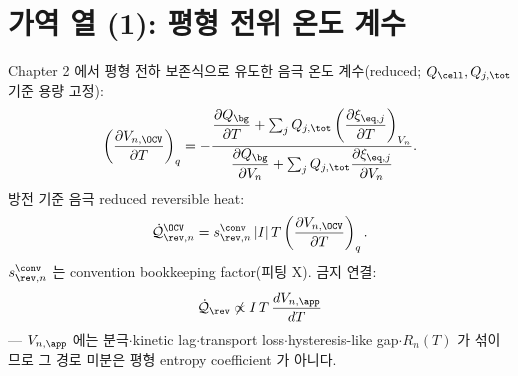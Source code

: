 \section{가역 열 (1): 평형 전위 온도 계수}\label{sec:ch4_revOCV}
Chapter 2 에서 평형 전하 보존식으로 유도한 음극 온도 계수(reduced; $Q_\cell,Q_{j,\tot}$ 기준 용량 고정):
\begin{equation}
\left(\frac{\partial V_{n,\OCV}}{\partial T}\right)_q
=-\frac{\dfrac{\partial Q_\bg}{\partial T}+\sum_jQ_{j,\tot}\left(\dfrac{\partial\xi_{\eq,j}}{\partial T}\right)_{V_n}}
{\dfrac{\partial Q_\bg}{\partial V_n}+\sum_jQ_{j,\tot}\dfrac{\partial\xi_{\eq,j}}{\partial V_n}}.
\label{eq:ch4_ocv_dvdt}
\end{equation}
방전 기준 음극 reduced reversible heat:
\begin{equation}
\dot{\mathcal Q}_{\rev,n}^{\OCV}=s_{\rev,n}^{\conv}\,|I|\,T\left(\frac{\partial V_{n,\OCV}}{\partial T}\right)_q.
\label{eq:ch4_rev_ocv}
\end{equation}
$s_{\rev,n}^{\conv}$ 는 convention bookkeeping factor(피팅 X). 금지 연결:
\begin{equation}
\dot{\mathcal Q}_{\rev}\not\propto I\,T\,\frac{dV_{n,\app}}{dT}
\label{eq:ch4_forbid}
\end{equation}
— $V_{n,\app}$ 에는 분극$\cdot$kinetic lag$\cdot$transport loss$\cdot$hysteresis-like gap$\cdot R_n(T)$ 가
섞이므로 그 경로 미분은 평형 entropy coefficient 가 아니다.

